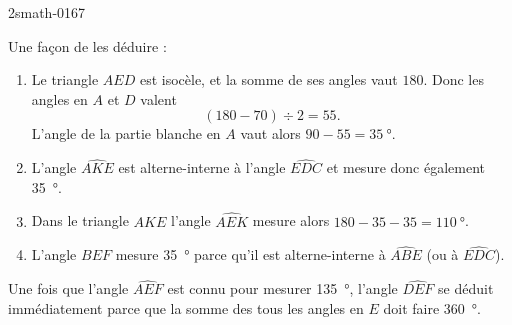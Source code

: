 \begin{corrige}{2smath-0167}
    \begin{center}
        \small

    \end{center}
    Une façon de les déduire :
    \begin{enumerate}
        \item
            Le triangle \( AED\) est isocèle, et la somme de ses angles vaut \( 180\). Donc les angles en \( A\) et \( D\) valent
            \begin{equation}
                (180-70)\div 2=55.
            \end{equation}
            L'angle de la partie blanche en \( A\) vaut alors \( 90-55=\SI{35}{\degree}\).
        \item
            L'angle \( \widehat{AKE}\) est alterne-interne à l'angle \( \widehat{EDC}\) et mesure donc également \SI{35}{\degree}.
        \item
            Dans le triangle \( AKE\) l'angle \( \widehat{AEK}\) mesure alors \( 180-35-35=\SI{110}{\degree}\).
        \item
            L'angle \( \widehat{BEF}\) mesure \SI{35}{\degree} parce qu'il est alterne-interne à \( \widehat{ABE}\) (ou à $\widehat{EDC}$).
    \end{enumerate}
    Une fois que l'angle \( \widehat{AEF}\) est connu pour mesurer \SI{135}{\degree}, l'angle $\widehat{DEF}$ se déduit immédiatement parce que la somme des tous les angles en \( E\) doit faire \SI{360}{\degree}.

\end{corrige}
